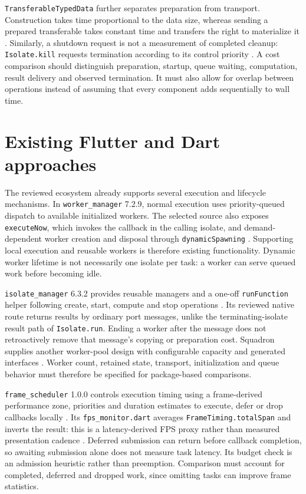 \documentclass[14pt,a4paper,oneside]{extreport}
\begin{document}
\texttt{TransferableTypedData} further separates preparation from transport. Construction
takes time proportional to the data size, whereas sending a prepared transferable takes
constant time and transfers the right to materialize it \citep{dart-transferable}. Similarly,
a shutdown request is not a measurement of completed cleanup: \texttt{Isolate.kill} requests
termination according to its control priority \citep{dart-kill}. A cost comparison should
distinguish preparation, startup, queue waiting, computation, result delivery and observed
termination. It must also allow for overlap between operations instead of assuming that every
component adds sequentially to wall time.

\section{Existing Flutter and Dart approaches}
\label{existing-flutter-and-dart-approaches}

The reviewed ecosystem already supports several execution and lifecycle mechanisms. In
\texttt{worker\_manager} 7.2.9, normal execution uses priority-queued dispatch to available
initialized workers. The selected source also exposes \texttt{executeNow}, which invokes the
callback in the calling isolate, and demand-dependent worker creation and disposal through
\texttt{dynamicSpawning} \citep{worker-manager}. Supporting local execution and reusable
workers is therefore existing functionality. Dynamic worker lifetime is not necessarily one
isolate per task: a worker can serve queued work before becoming idle.

\texttt{isolate\_manager} 6.3.2 provides reusable managers and a one-off \texttt{runFunction}
helper following create, start, compute and stop operations \citep{isolate-manager}. Its
reviewed native route returns results by ordinary port messages, unlike the
terminating-isolate result path of \texttt{Isolate.run}. Ending a worker after the message
does not retroactively remove that message's copying or preparation cost. Squadron supplies
another worker-pool design with configurable capacity and generated interfaces
\citep{squadron}. Worker count, retained state, transport, initialization and queue behavior
must therefore be specified for package-based comparisons.

\texttt{frame\_scheduler} 1.0.0 controls execution timing using a frame-derived performance
zone, priorities and duration estimates to execute, defer or drop callbacks locally
\citep{frame-scheduler}. Its \texttt{fps\_monitor.dart} averages
\texttt{FrameTiming.totalSpan} and inverts the result: this is a latency-derived FPS proxy
rather than measured presentation cadence \citep{frame-fps-source}. Deferred submission can
return before callback completion, so awaiting submission alone does not measure task latency.
Its budget check is an admission heuristic rather than preemption. Comparison must account for
completed, deferred and dropped work, since omitting tasks can improve frame statistics.
\end{document}
